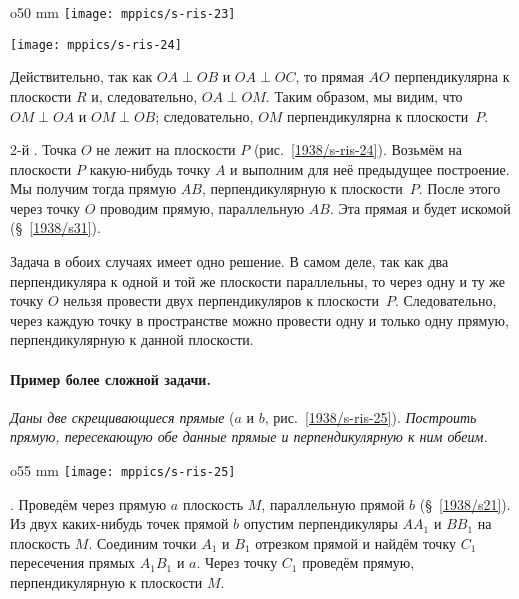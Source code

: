\begin{wrapfigure}{o}{50 mm}
\centering
\texttt{[image: mppics/s-ris-23]}
\caption{}\label{1938/s-ris-23}
\bigskip
\texttt{[image: mppics/s-ris-24]}
\caption{}\label{1938/s-ris-24}
\end{wrapfigure}

Действительно, так как $OA \perp OB$ и $OA \perp OC$, то прямая $AO$ перпендикулярна к плоскости $R$ и, следовательно, $OA \perp OM$.
Таким образом, мы видим, что $OM\perp OA$ и $OM\perp OB$;
следовательно, $OM$ перпендикулярна к плоскости~$P$.

2-й \mbox{.}
Точка $O$ не лежит на плоскости $P$ (рис.~\ref{1938/s-ris-24}).
Возьмём на плоскости $P$ какую-нибудь точку $A$ и выполним для неё предыдущее построение.
Мы получим тогда прямую $AB$, перпендикулярную к плоскости~$P$.
После этого через точку $O$ проводим прямую, параллельную $AB$.
Эта прямая и будет искомой (§~\ref{1938/s31}).

\medskip

Задача в обоих случаях имеет одно решение.
В самом деле, так как два перпендикуляра к одной и той же плоскости параллельны, то через одну и ту же точку $O$ нельзя провести двух перпендикуляров к плоскости~$P$.
Следовательно, через каждую точку в пространстве можно провести одну и только одну прямую, перпендикулярную к данной плоскости.

\paragraph{Пример более сложной задачи.}\label{1938/s37}
\emph{Даны две скрещивающиеся прямые} ($a$ и $b$, рис.~\ref{1938/s-ris-25}).
\emph{Построить прямую, пересекающую обе данные прямые и перпендикулярную к ним обеим.}

\medskip

{

\begin{wrapfigure}{o}{55 mm}
\vskip-3mm
\centering
\texttt{[image: mppics/s-ris-25]}
\caption{}\label{1938/s-ris-25}
\end{wrapfigure}

\mbox{.}
Проведём через прямую $a$ плоскость $M$, параллельную прямой $b$ (§~\ref{1938/s21}).
Из двух каких-нибудь точек прямой $b$ опустим перпендикуляры $AA_1$ и $BB_1$ на плоскость $M$.
Соединим точки $A_1$ и $B_1$ отрезком прямой и найдём точку $C_1$ пересечения прямых $A_1B_1$ и $a$.
Через точку $C_1$ проведём прямую, перпендикулярную к плоскости $M$.

}


